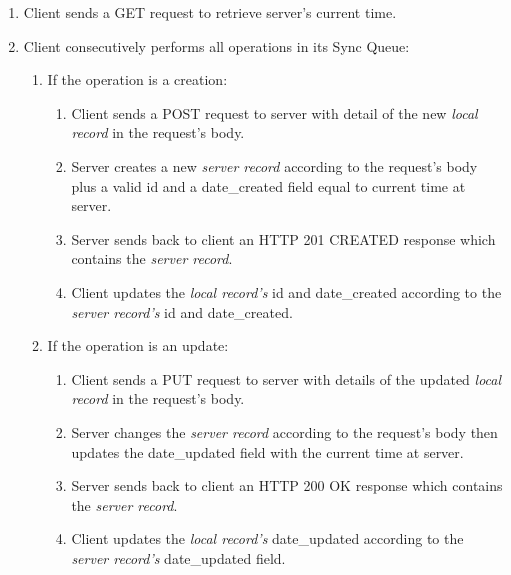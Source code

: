 \begin{enumerate}
   \item Client sends a GET request to retrieve server's current time.
   \item Client consecutively performs all operations in its Sync Queue:

     \begin{enumerate}
       \item If the operation is a creation:
         \begin{enumerate}
           \item Client sends a POST request to server with detail of the new \textit{local record} in the request's body.
           \item Server creates a new \textit{server record} according to the request's body plus a valid id and a date\_created field equal to current time at server.
           \item Server sends back to client an HTTP 201 CREATED response which contains the \textit{server record}.
           \item Client updates the \textit{local record's} id and date\_created according to the \textit{server record's} id and date\_created.
         \end{enumerate}
         
       \item If the operation is an update:
         \begin{enumerate}
           \item Client sends a PUT request to server with details of the updated \textit{local record} in the request's body.
           \item Server changes the \textit{server record} according to the request's body then updates the date\_updated field with the current time at server.
           \item Server sends back to client an HTTP 200 OK response which contains the \textit{server record}.
           \item Client updates the \textit{local record's} date\_updated according to the \textit{server record's} date\_updated field.
         \end{enumerate}
               

\end{enumerate}
\end{enumerate}
